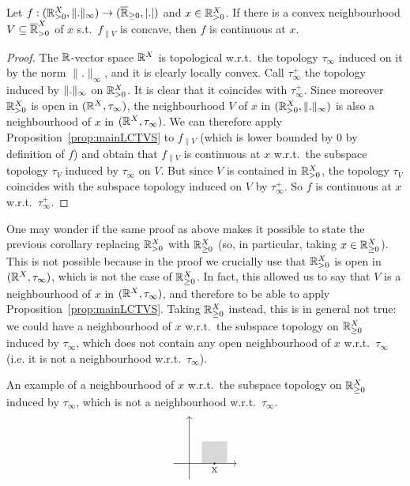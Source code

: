 \begin{corollary}\label{cor:cont}
 Let $f:({\mathbb{R}}_{> 0}^X,\lVert.\rVert_\infty) \to (\overline{\mathbb{R}}_{\geq 0},\left\lvert.\right\rvert)$ and $x\in {\mathbb{R}}_{> 0}^X$.
 If there is a convex neighbourhood $V\subseteq \overline{\mathbb{R}}_{> 0}^X$ of $x$ s.t.\ $f_{\lVert V}$ is concave, then $f$ is continuous at $x$.
\end{corollary}
\begin{proof}
 The $\mathbb{R}$-vector space $\mathbb{R}^X$ is topological w.r.t.\ the topology $\tau_\infty$ induced on it by the norm $\lVert .\lVert_\infty$, and it is clearly locally convex.
 Call $\tau^+_\infty$ the topology induced by $\lVert.\rVert_\infty$ on ${\mathbb{R}}_{> 0}^X$.
 It is clear that it coincides with $\tau^+_\infty$.
 Since moreover ${\mathbb{R}}_{> 0}^X$ is open in $(\mathbb{R}^X,\tau_\infty)$, the neighbourhood $V$ of $x$ in $({\mathbb{R}}_{> 0}^X,\lVert.\rVert_\infty)$ is also a neighbourhood of $x$ in $(\mathbb{R}^X,\tau_\infty)$.
 We can therefore apply Proposition~\ref{prop:mainLCTVS} to $f_{\lVert V}$ (which is lower bounded by $0$ by definition of $f$) and obtain that $f_{\lVert V}$ is continuous at $x$ w.r.t.\ the subspace topology $\tau_V$ induced by $\tau_\infty$ on $V$.
 But since $V$ is contained in ${\mathbb{R}}_{> 0}^X$, the topology $\tau_V$ coincides with the subspace topology induced on $V$ by $\tau^+_\infty$.
 So $f$ is continuous at $x$ w.r.t.\ $\tau^+_\infty$.
\end{proof}

One may wonder if the same proof as above makes it possible to state the previous corollary replacing ${\mathbb{R}}_{> 0}^X$ with $\mathbb{R}_{\geq 0}^X$ (so, in particular, taking $x\in\mathbb{R}_{\geq 0}^X$).
This is not possible because in the proof we crucially use that $\mathbb{R}_{> 0}^X$ is open in $(\mathbb{R}^X,\tau_\infty)$, which is not the case of $\mathbb{R}_{\geq 0}^X$.
In fact, this allowed us to say that $V$ is a neighbourhood of $x$ in $(\mathbb{R}^X,\tau_\infty)$, and therefore to be able to apply Proposition~\ref{prop:mainLCTVS}.
Taking $\mathbb{R}_{\geq 0}^X$ instead, this is in general not true: we could have a neighbourhood of $x$ w.r.t.\ the subspace topology on $\mathbb{R}_{\geq 0}^X$ induced by $\tau_\infty$, which does not contain any open neighbourhood of $x$ w.r.t.\ $\tau_\infty$ (i.e. it is not a neighbourhood w.r.t.\ $\tau_\infty$).

\begin{example}
 An example of a neighbourhood of $x$ w.r.t.\ the subspace topology on $\mathbb{R}_{\geq 0}^X$ induced by $\tau_\infty$, which is not a neighbourhood w.r.t.\ $\tau_\infty$.
 \[\begin{tikzpicture}
 \draw[->] (0,-0.5) -- (0,1.5);
 \draw[->] (-0.5,0) -- (1.5,0);
 \filldraw[black] (0.8,0) circle (0.7pt) node[anchor=north]{x};
 \fill[fill=gray, fill opacity=0.3] (0.4,0) -- (1.2,0) -- (1.2,0.7) -- (0.4,0.7) -- (0.4,0) -- cycle;
\end{tikzpicture}\]
\end{example}

